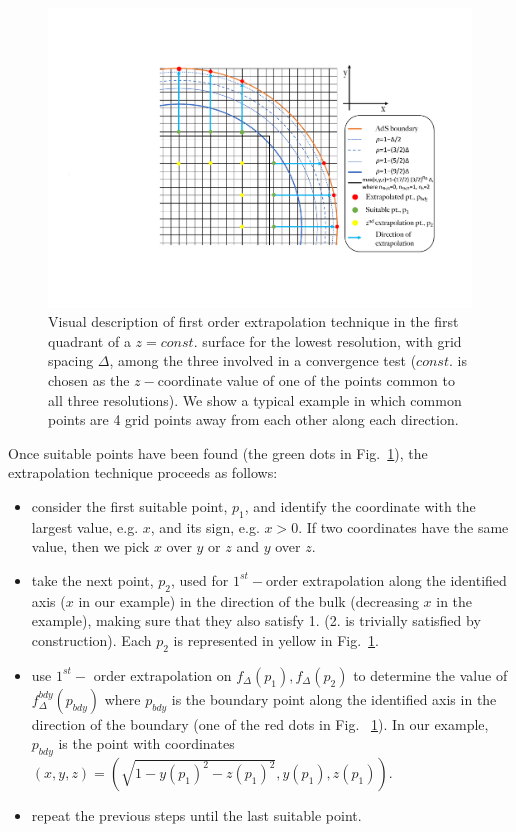 \documentclass[a4paper,11pt]{article}
\numberwithin{equation}{section}
\begin{document}
\begin{figure}[h]
        \centering
        \includegraphics[width=5.0in,clip=true]{plots/lego_circle/Lego_circle_new.pdf}
\parbox{5.0in}{\caption{Visual description of first order extrapolation technique in the first quadrant of a $z=const.$ surface for the lowest resolution, with grid spacing $\Delta$, among the three involved in a convergence test ($const.$ is chosen as the $z-$coordinate value of one of the points common to all three resolutions). We show a typical example in which common points are 4 grid points away from each other along each direction.
        }\label{fig:lego_circle}}
\end{figure}
 
Once suitable points have been found (the green dots in Fig.~\ref{fig:lego_circle}), the extrapolation technique proceeds as follows:
 \begin{itemize}
 \item consider the first suitable point, $p_1$, and identify the coordinate with the largest value, e.g. $x$, and its sign, e.g. $x>0$. If two coordinates have the same value, then we pick $x$ over $y$ or $z$ and $y$ over $z$.
 \item take the next point, $p_2$, used for $1^{st}-$order extrapolation along the identified axis ($x$ in our example) in the direction of the bulk (decreasing $x$ in the example), making sure that they also satisfy 1. (2. is trivially satisfied by construction). Each $p_2$ is represented in yellow in Fig.~\ref{fig:lego_circle}.
 \item use $1^{st}-$ order extrapolation on $f_\Delta(p_1),f_\Delta(p_{2})$ to determine the value of $f^{bdy}_{\Delta}(p_{bdy})$ where $p_{bdy}$ is the boundary point along the identified axis in the direction of the boundary (one of the red dots in Fig. ~\ref{fig:lego_circle}). In our example, $p_{bdy}$ is the point with coordinates $(x,y,z)=(\sqrt{1-y(p_1)^2-z(p_1)^2},y(p_1),z(p_1))$.
 \item repeat the previous steps until the last suitable point.
 \end{itemize}
\end{document}
